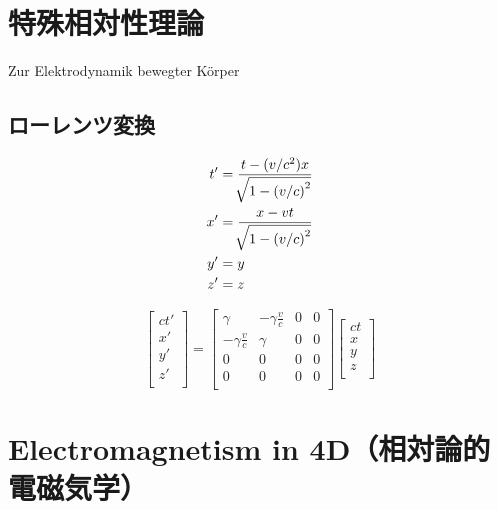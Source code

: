 \section{特殊相対性理論}
Zur Elektrodynamik bewegter K\"{o}rper


%
%
\subsection{ローレンツ変換}
\begin{align}
  t' & = \frac{t - (v/c^2)x}{\sqrt[]{\mathstrut 1 - {(v/c)}^2}} \\
  x' & = \frac{x - vt}{\sqrt[]{\mathstrut 1 - {(v/c)}^2}} \\
  y' & = y \\
  z' & = z
\end{align}

\begin{equation}
  \left[
    \begin{array}{c}
      ct' \\ x' \\ y' \\ z' \\
    \end{array}
  \right]
  =
  \left[
    \begin{array}{cccc}
      \gamma & -\gamma \frac{v}{c} & 0 & 0 \\
      -\gamma \frac{v}{c} & \gamma & 0 & 0 \\
      0 & 0 & 0 & 0 \\
      0 & 0 & 0 & 0 \\
    \end{array}
  \right]
  \left[
    \begin{array}{c}
      ct \\ x \\ y \\ z \\
    \end{array}
  \right]
\end{equation}



%
%
%
%
\section{Electromagnetism in 4D（相対論的電磁気学）}


